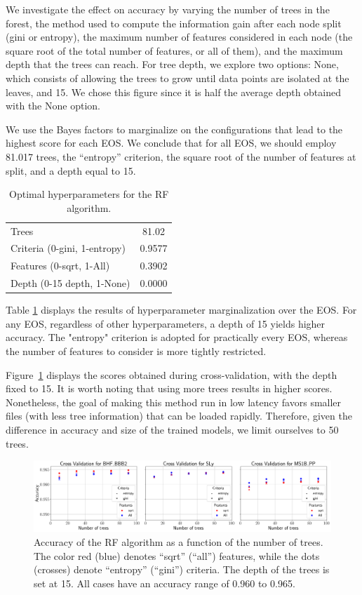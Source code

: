 We investigate the effect on accuracy by varying the number of trees in the forest, the method used to compute the information gain after each node split (gini or entropy), the maximum number of features considered in each node (the square root of the total number of features, or all of them), and the maximum depth that the trees can reach. For tree depth, we explore two options: None, which consists of allowing the trees to grow until data points are isolated at the leaves, and 15. We chose this figure since it is half the average depth obtained with the None option.

We use the Bayes factors to marginalize on the configurations that lead to the highest score for each \ac{EOS}. We conclude that for all \ac{EOS}, we should employ 81.017 trees, the ``entropy'' criterion, the square root of the number of features at split, and a depth equal to 15.


\begin{table}[h]
\begin{tabular}{|l|c|}
\hline
Trees& 81.02 \\
Criteria (0-gini, 1-entropy)& 0.9577 \\
Features (0-sqrt, 1-All)& 0.3902  \\
Depth (0-15 depth, 1-None)& 0.0000 \\ \hline
\end{tabular}
\caption{Optimal hyperparameters for the \ac{RF} algorithm. \label{tab:RF_cross_params}}
\end{table}

Table \ref{tab:RF_cross_params} displays the results of hyperparameter marginalization over the \ac{EOS}. For any \ac{EOS}, regardless of other hyperparameters, a depth of 15 yields higher accuracy. The "entropy" criterion is adopted for practically every \ac{EOS}, whereas the number of features to consider is more tightly restricted.

Figure~\ref{fig:crossvalRF} displays the scores obtained during cross-validation, with the depth fixed to 15. It is worth noting that using more trees results in higher scores. Nonetheless, the goal of making this method run in low latency favors smaller files (with less tree information) that can be loaded rapidly. Therefore, given the difference in accuracy and size of the trained models, we limit ourselves to 50 trees.

\begin{figure}%
\includegraphics[width=\linewidth]{cross_val_RF}
\caption{Accuracy of the \ac{RF} algorithm as a function of the number of trees.  The color red (blue) denotes ``sqrt'' (``all'') features, while the dots (crosses) denote ``entropy'' (``gini'') criteria. The depth of the trees is set at 15. All cases have an accuracy range of 0.960 to 0.965.}
\label{fig:crossvalRF}
\end{figure}

